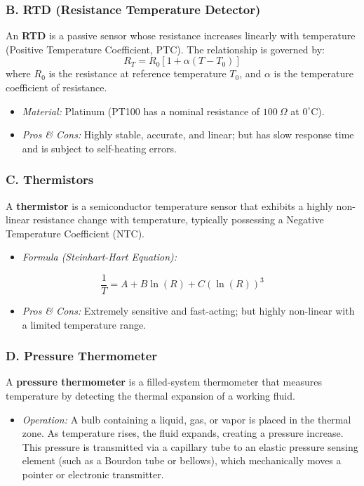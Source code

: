 \subsubsection{B. RTD (Resistance Temperature Detector)}
An \textbf{RTD} is a passive sensor whose resistance increases linearly with temperature (Positive Temperature Coefficient, PTC). The relationship is governed by:
\[ R_T = R_0 [1 + \alpha(T - T_0)] \]
where $R_0$ is the resistance at reference temperature $T_0$, and $\alpha$ is the temperature coefficient of resistance.
\begin{itemize}
  \item \textit{Material:} Platinum (PT100 has a nominal resistance of $100\ \Omega$ at $0^\circ\text{C}$).
  \item \textit{Pros \& Cons:} Highly stable, accurate, and linear; but has slow response time and is subject to self-heating errors.
\end{itemize}

\subsubsection{C. Thermistors}
A \textbf{thermistor} is a semiconductor temperature sensor that exhibits a highly non-linear resistance change with temperature, typically possessing a Negative Temperature Coefficient (NTC).
\begin{itemize}
  \item \textit{Formula (Steinhart-Hart Equation):}
\end{itemize}
  \[ \frac{1}{T} = A + B \ln(R) + C (\ln(R))^3 \]
\begin{itemize}
  \item \textit{Pros \& Cons:} Extremely sensitive and fast-acting; but highly non-linear with a limited temperature range.
\end{itemize}

\subsubsection{D. Pressure Thermometer}
A \textbf{pressure thermometer} is a filled-system thermometer that measures temperature by detecting the thermal expansion of a working fluid.
\begin{itemize}
  \item \textit{Operation:} A bulb containing a liquid, gas, or vapor is placed in the thermal zone. As temperature rises, the fluid expands, creating a pressure increase. This pressure is transmitted via a capillary tube to an elastic pressure sensing element (such as a Bourdon tube or bellows), which mechanically moves a pointer or electronic transmitter.
\end{itemize}


